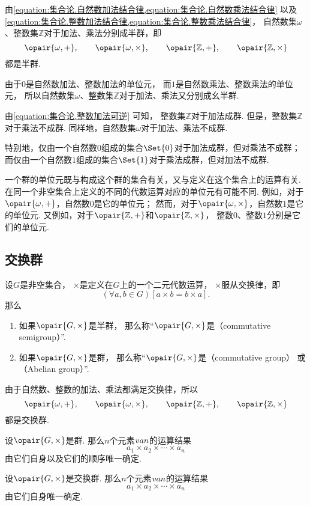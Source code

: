 由\cref{equation:集合论.自然数加法结合律,equation:集合论.自然数乘法结合律}
以及\cref{equation:集合论.整数加法结合律,equation:集合论.整数乘法结合律}，
自然数集\(\omega\)、整数集\(\mathbb{Z}\)对于加法、乘法分别成半群，即\[
	\opair{\omega,+}, \qquad
	\opair{\omega,\times}, \qquad
	\opair{\mathbb{Z},+}, \qquad
	\opair{\mathbb{Z},\times}
\]都是半群.

由于\(0\)是自然数加法、整数加法的单位元，
而\(1\)是自然数乘法、整数乘法的单位元，
所以自然数集\(\omega\)、整数集\(\mathbb{Z}\)对于加法、乘法又分别成幺半群.

由\cref{equation:集合论.整数加法可逆} 可知，
整数集\(\mathbb{Z}\)对于加法成群.
但是，整数集\(\mathbb{Z}\)对于乘法不成群.
同样地，自然数集\(\omega\)对于加法、乘法不成群.

特别地，仅由一个自然数\(0\)组成的集合\(\Set{0}\)对于加法成群，但对乘法不成群；
而仅由一个自然数\(1\)组成的集合\(\Set{1}\)对于乘法成群，但对加法不成群.

一个群的单位元既与构成这个群的集合有关，又与定义在这个集合上的运算有关.
在同一个非空集合上定义的不同的代数运算对应的单位元有可能不同.
例如，对于\(\opair{\omega,+}\)，自然数\(0\)是它的单位元；
然而，对于\(\opair{\omega,\times}\)，自然数\(1\)是它的单位元.
又例如，对于\(\opair{\mathbb{Z},+}\)和\(\opair{\mathbb{Z},\times}\)，
整数\(0\)、整数\(1\)分别是它们的单位元.

\subsection{交换群}
\begin{definition}
设\(G\)是非空集合，
\(\times\)是定义在\(G\)上的一个二元代数运算，
\(\times\)服从交换律，即\[
	(\forall a,b \in G)[a \times b = b \times a].
\]
那么\begin{enumerate}
	\item 如果\(\opair{G,\times}\)是半群，
	那么称“\(\opair{G,\times}\)是（commutative semigroup）”.
	\item 如果\(\opair{G,\times}\)是群，
	那么称“\(\opair{G,\times}\)是（commutative group）%
	或（Abelian group）”.
\end{enumerate}
\end{definition}

由于自然数、整数的加法、乘法都满足交换律，所以\[
	\opair{\omega,+}, \qquad
	\opair{\omega,\times}, \qquad
	\opair{\mathbb{Z},+}, \qquad
	\opair{\mathbb{Z},\times}
\]都是交换群.

\begin{theorem}
设\(\opair{G,\times}\)是群.
那么\(n\)个元素\(v{a}{n}\)的运算结果\[
	a_1 \times a_2 \times \dotsb \times a_n
\]由它们自身以及它们的顺序唯一确定.
\end{theorem}

\begin{corollary}
设\(\opair{G,\times}\)是交换群.
那么\(n\)个元素\(v{a}{n}\)的运算结果\[
	a_1 \times a_2 \times \dotsb \times a_n
\]由它们自身唯一确定.
\end{corollary}
